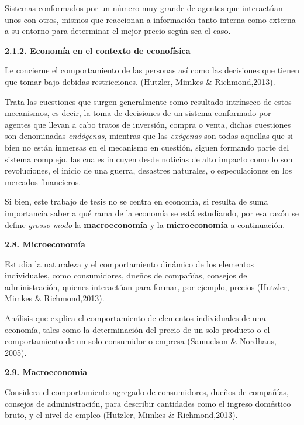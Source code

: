 Sistemas conformados por un número muy grande de agentes que interactúan unos con otros, mismos que reaccionan a información tanto interna como externa a su entorno para determinar el mejor precio según sea el caso.
\newline

{
\noindent
\Large  \textbf{2.1.2. Economía en el contexto de econofísica} 
}

Le concierne el comportamiento de las personas así como las decisiones que tienen que tomar bajo debidas restricciones. (Hutzler, Mimkes \& Richmond,2013).
\newline


Trata las cuestiones que surgen generalmente como resultado intrínseco de estos mecanismos, es decir, la toma de decisiones de un sistema conformado por agentes que llevan a cabo tratos de inversión, compra o venta, dichas cuestiones son denominadas \textit{endógenas}, mientras que las \textit{exógenas} son todas aquellas que si bien no están inmersas en el mecanismo en cuestión, siguen formando parte del sistema complejo, las cuales inlcuyen desde noticias de alto impacto como lo son revoluciones, el inicio de una guerra, desastres naturales, o especulaciones en los mercados financieros.  
\newline

Si bien, este trabajo de tesis no se centra en economía, si resulta de suma importancia saber a qué rama de la economía se está estudiando, por esa razón se define \textit{grosso modo} la \textbf{macroeconomía} y la \textbf{microeconomía} a continuación.
\newline

{
\noindent
\Large  \textbf{2.8. Microeconomía} 
}

Estudia la naturaleza y el comportamiento dinámico de los elementos individuales, como consumidores, dueños de compañías, consejos de administración, quienes interactúan para formar, por ejemplo, precios (Hutzler, Mimkes \& Richmond,2013).
\newline

Análisis que explica el comportamiento de elementos individuales de una economía, tales como la determinación del precio de un solo producto o el comportamiento de un solo consumidor o empresa (Samuelson \& Nordhaus, 2005).
\newline

{
\noindent
\Large  \textbf{2.9. Macroeconomía} 
}

Considera el comportamiento agregado de consumidores, dueños de compañías, consejos de administración, para describir cantidades como el ingreso doméstico bruto, y el nivel de empleo  (Hutzler, Mimkes \& Richmond,2013).
\newline

